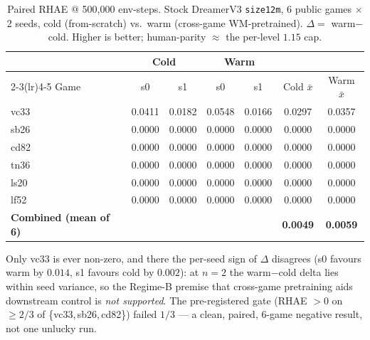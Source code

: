 \documentclass[10pt]{article}
\begin{document}
\begin{table}[h]
\centering
\small
\caption{Paired RHAE @ 500{,}000 env-steps. Stock DreamerV3 \texttt{size12m},
6 public games $\times$ 2 seeds, cold (from-scratch) vs.\ warm (cross-game
WM-pretrained). $\Delta=$ warm$-$cold. Higher is better; human-parity $\approx$
the per-level $1.15$ cap.}
\label{tab:rhae}
\begin{tabular}{lcccccc}
\toprule
& \multicolumn{2}{c}{Cold} & \multicolumn{2}{c}{Warm} & & \\
\cmidrule(lr){2-3}\cmidrule(lr){4-5}
Game & s0 & s1 & s0 & s1 & Cold $\bar{x}$ & Warm $\bar{x}$ \\
\midrule
vc33 & 0.0411 & 0.0182 & 0.0548 & 0.0166 & 0.0297 & 0.0357 \\
sb26 & 0.0000 & 0.0000 & 0.0000 & 0.0000 & 0.0000 & 0.0000 \\
cd82 & 0.0000 & 0.0000 & 0.0000 & 0.0000 & 0.0000 & 0.0000 \\
tn36 & 0.0000 & 0.0000 & 0.0000 & 0.0000 & 0.0000 & 0.0000 \\
ls20 & 0.0000 & 0.0000 & 0.0000 & 0.0000 & 0.0000 & 0.0000 \\
lf52 & 0.0000 & 0.0000 & 0.0000 & 0.0000 & 0.0000 & 0.0000 \\
\midrule
\textbf{Combined (mean of 6)} & & & & & \textbf{0.0049} & \textbf{0.0059} \\
\bottomrule
\end{tabular}
\end{table}

\vspace{-0.4em}
Only vc33 is ever non-zero, and there the per-seed sign of $\Delta$ disagrees
(s0 favours warm by $0.014$, s1 favours cold by $0.002$): at $n=2$ the
warm$-$cold delta lies within seed variance, so the Regime-B premise that
cross-game pretraining aids downstream control is \emph{not supported}. The
pre-registered gate (RHAE $>0$ on $\ge 2/3$ of \{vc33,\,sb26,\,cd82\}) failed
$1/3$ --- a clean, paired, 6-game negative result, not one unlucky run.
\end{document}
